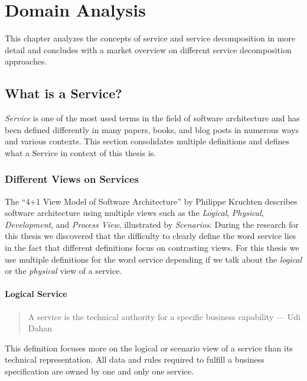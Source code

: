 \chapter{Domain Analysis}
\label{cha:analysis}

This chapter analyzes the concepts of service and service decomposition in more detail and concludes with a market overview on different service decomposition approaches. 

\section{What is a Service?}
\label{sec:serviceIntro}

\textit{Service} is one of the most used terms in the field of software architecture and has been defined differently in many papers, books, and blog posts in numerous ways and various contexts. This section consolidates multiple definitions and defines what a Service in context of this thesis is.

\subsection{Different Views on Services}

The \enquote{4+1 View Model of Software Architecture} by Philippe Kruchten\cite{fourPlusOne} describes software architecture using multiple views such as the \textit{Logical}, \textit{Physical}, \textit{Development}, and \textit{Process View}, illustrated by \textit{Scenarios}. During the research for this thesis we discovered that the difficulty to clearly define the word service lies in the fact that different definitions focus on contrasting views. For this thesis we use multiple definitions for the word service depending if we talk about the \textit{logical} or the \textit{physical} view of a service.

\subsubsection{Logical Service}

\begin{quotation}
A service is the technical authority for a specific business capability --- Udi Dahan\cite{serviceDefinitionDahan}
\end{quotation}
   
This definition focuses more on the logical or scenario view of a service than its technical representation. All data and rules required to fulfill a business specification are owned by one and only one service. 

